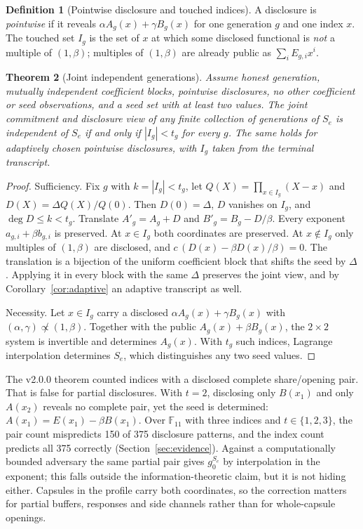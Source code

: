 \documentclass[pdflatex,sn-mathphys-num,twocolumn]{sn-jnl}
\theoremstyle{plain}
\newtheorem{theorem}{Theorem}
\theoremstyle{definition}
\newtheorem{definition}[theorem]{Definition}
\newcommand{\F}{\mathbb{F}}
\begin{document}
\begin{definition}[Pointwise disclosure and touched indices]
A disclosure is \emph{pointwise} if it reveals $\alpha A_g(x)+\gamma B_g(x)$ for one generation $g$ and one index $x$. The touched set $I_g$ is the set of $x$ at which some disclosed functional is \emph{not} a multiple of $(1,\beta)$; multiples of $(1,\beta)$ are already public as $\sum_iE_{g,i}x^i$.
\end{definition}

\begin{keyresult}
\begin{theorem}[Joint independent generations]\label{thm:generations}
Assume honest generation, mutually independent coefficient blocks, pointwise disclosures, no other coefficient or seed observations, and a seed set with at least two values. The joint commitment and disclosure view of any finite collection of generations of $S_e$ is independent of $S_e$ if and only if $|I_g|<t_g$ for every $g$. The same holds for adaptively chosen pointwise disclosures, with $I_g$ taken from the terminal transcript.
\end{theorem}
\end{keyresult}
\begin{proof}
Sufficiency. Fix $g$ with $k=|I_g|<t_g$, let $Q(X)=\prod_{x\in I_g}(X-x)$ and $D(X)=\Delta Q(X)/Q(0)$. Then $D(0)=\Delta$, $D$ vanishes on $I_g$, and $\deg D\le k<t_g$. Translate $A'_g=A_g+D$ and $B'_g=B_g-D/\beta$. Every exponent $a_{g,i}+\beta b_{g,i}$ is preserved. At $x\in I_g$ both coordinates are preserved. At $x\notin I_g$ only multiples of $(1,\beta)$ are disclosed, and $c\,(D(x)-\beta D(x)/\beta)=0$. The translation is a bijection of the uniform coefficient block that shifts the seed by $\Delta$. Applying it in every block with the same $\Delta$ preserves the joint view, and by Corollary~\ref{cor:adaptive} an adaptive transcript as well.

Necessity. Let $x\in I_g$ carry a disclosed $\alpha A_g(x)+\gamma B_g(x)$ with $(\alpha,\gamma)\not\propto(1,\beta)$. Together with the public $A_g(x)+\beta B_g(x)$, the $2\times2$ system is invertible and determines $A_g(x)$. With $t_g$ such indices, Lagrange interpolation determines $S_e$, which distinguishes any two seed values.
\end{proof}

The v2.0.0 theorem counted indices with a disclosed complete share/opening pair. That is false for partial disclosures. With $t=2$, disclosing only $B(x_1)$ and only $A(x_2)$ reveals no complete pair, yet the seed is determined: $A(x_1)=E(x_1)-\beta B(x_1)$. Over $\F_{11}$ with three indices and $t\in\{1,2,3\}$, the pair count mispredicts 150 of 375 disclosure patterns, and the index count predicts all 375 correctly (Section~\ref{sec:evidence}). Against a computationally bounded adversary the same partial pair gives $g_0^{S_e}$ by interpolation in the exponent; this falls outside the information-theoretic claim, but it is not hiding either. Capsules in the profile carry both coordinates, so the correction matters for partial buffers, responses and side channels rather than for whole-capsule openings.
\end{document}
